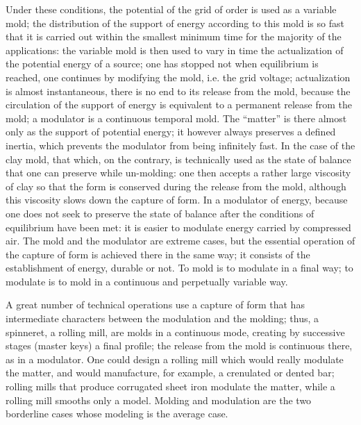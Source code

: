 \documentclass[a4paper]{article}
\begin{document}
Under these conditions, the potential of the grid of order is used as a variable mold; the distribution of the support of energy according to this mold is so fast that it is carried out within the smallest minimum time for the majority of the applications: the variable mold is then used to vary in time the actualization of the potential energy of a source; one has stopped not when equilibrium is reached, one continues by modifying the mold, i.e. the grid voltage; actualization is almost instantaneous, there is no end to its release from the mold, because the circulation of the support of energy is equivalent to a permanent release from the mold; a modulator is a continuous temporal mold. The “matter” is there almost only as the support of potential energy; it however always preserves a defined inertia, which prevents the modulator from being infinitely fast. In the case of the clay mold, that which, on the contrary, is technically used as the state of balance that one can preserve while un-molding: one then accepts a rather large viscosity of clay so that the form is conserved during the release from the mold, although this viscosity slows down the capture of form. In a modulator of energy, because one does not seek to preserve the state of balance after the conditions of equilibrium have been met: it is easier to modulate energy carried by compressed air. The mold and the modulator are extreme cases, but the essential operation of the capture of form is achieved there in the same way; it consists of the establishment of energy, durable or not. To mold is to modulate in a final way; to modulate is to mold in a continuous and perpetually variable way.

A great number of technical operations use a capture of form that has intermediate characters between the modulation and the molding; thus, a spinneret, a rolling mill, are molds in a continuous mode, creating by successive stages (master keys) a final profile; the release from the mold is continuous there, as in a modulator. One could design a rolling mill which would really modulate the matter, and would manufacture, for example, a crenulated or dented bar; rolling mills that produce corrugated sheet iron modulate the matter, while a rolling mill smooths only a model. Molding and modulation are the two borderline cases whose modeling is the average case.
\end{document}
